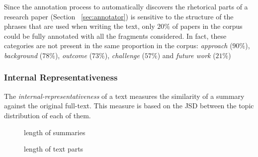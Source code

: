 Since the annotation process to automatically discovers the rhetorical parts of a research paper (Section ~\ref{sec:annotator}) is sensitive to the structure of the phrases that are used when writing the text, only $20\%$ of papers in the corpus could be fully annotated with all the fragments considered. In fact, these categories are not present in the same proportion in the corpus: \textit{approach} ($90\%$), \textit{background} ($78\%$), \textit{outcome} ($73\%$), \textit{challenge} ($57\%$) and \textit{future work} ($21\%$)

\subsubsection{Internal Representativeness}

The \textit{internal-representativeness} of a text measures the similarity of a summary against the original full-text. This measure is based on the JSD between the topic distribution of each of them. 

\begin{figure}[!htb]\centering
   \begin{minipage}{0.49\textwidth}
     \caption{length of summaries}\label{fig:size}
   \end{minipage}
   \begin {minipage}[c]{0.49\textwidth}
     \caption{length of text parts}\label{fig:relativeSize}
   \end{minipage}
\end{figure}

